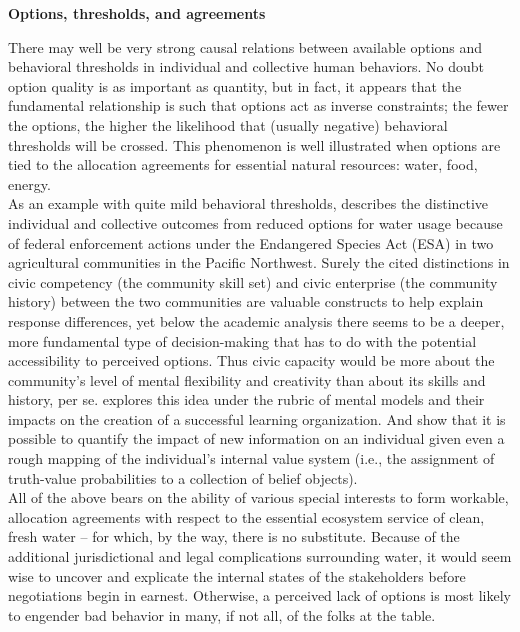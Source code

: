 \documentclass[12pt]{article}
\begin{document}
\begin{center}
\textbf{\normalsize Options, thresholds, and agreements}
\end{center}
There may well be very strong causal relations between available options and behavioral thresholds in individual and collective human behaviors. No doubt option quality is as important as quantity, but in fact, it appears that the fundamental relationship is such that options act as inverse constraints; the fewer the options, the higher the likelihood that (usually negative) behavioral thresholds will be crossed. This phenomenon is well illustrated when  options are tied to the allocation agreements for essential natural resources: water, food, energy.\\

As an example with quite mild behavioral thresholds,  describes the distinctive individual and collective outcomes from reduced options for water usage because of federal enforcement actions under the Endangered Species Act (ESA) in two agricultural communities in the Pacific Northwest. Surely the cited distinctions in civic competency (the community skill set) and civic enterprise (the community history) between the two communities are valuable constructs to help explain response differences, yet below the academic analysis there seems to be a deeper, more fundamental type of decision-making that has to do with the potential accessibility to perceived options. Thus civic capacity would be more about the community's level of mental flexibility and creativity than about its skills and history, per se.  explores this idea under the rubric of mental models and their impacts on the creation of a successful learning organization. And  show that it is possible to quantify the impact of new information on an individual given even a rough mapping of the individual's internal value system (i.e., the assignment of truth-value probabilities to a collection of belief objects).\\

All of the above bears on the ability of various special interests to form workable, allocation agreements with respect to the essential ecosystem service of clean, fresh water -- for which, by the way, there is no substitute. Because of the additional jurisdictional and legal complications surrounding water, it would seem wise to uncover and explicate the internal states of the stakeholders before negotiations begin in earnest. Otherwise, a perceived lack of options is most likely to engender bad behavior in many, if not all, of the folks at the table. \\

\renewcommand{\refname}{\normalfont\selectfont\small \textbf{References}} 


\end{document}
